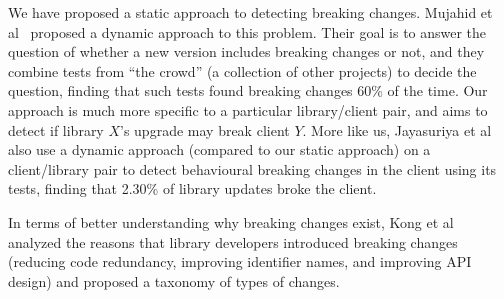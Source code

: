 We have proposed a static approach to detecting breaking changes. Mujahid et al~\cite{mujahid20:_using_other_tests_ident_break_updat} proposed a dynamic approach to this problem. Their goal is to answer the question of whether a new version includes breaking changes or not, and they combine tests from ``the crowd'' (a collection of other projects) to decide the question, finding that such tests found breaking changes 60\% of the time. Our approach is much more specific to a particular library/client pair, and aims to detect if library $X$'s upgrade may break client $Y$. More like us, Jayasuriya et al~\cite{jayasuriya24:_under_apis} also use a dynamic approach (compared to our static approach) on a client/library pair to detect behavioural breaking changes in the client using its tests, finding that 2.30\% of library updates broke the client.

In terms of better understanding why breaking changes exist, Kong et al~\cite{kong25:_towar_better_compr_break_chang_npm_ecosy} analyzed the reasons that library developers introduced breaking changes (reducing code redundancy, improving identifier names, and improving API design) and proposed a taxonomy of types of changes.
